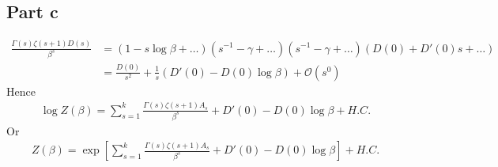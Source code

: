 \documentclass[a4paper,12pt]{article}
\begin{document}
\subsection*{Part c}
\begin{equation}
	\begin{aligned}
		\frac{\Gamma(s)\zeta(s+1)D(s)}{\beta^{s}}&=(1-s\log \beta+\dots)(s^{-1}-\gamma+\dots)(s^{-1}-\gamma+\dots)(D(0)+D'(0)s+\dots)
		\\&=\frac{D(0)}{s^2}+\frac{1}{s}(D'(0)-D(0)\log \beta)+\mathcal{O}(s^{0})
	\end{aligned}
\end{equation}
Hence
\begin{equation}
\begin{aligned}
\log Z(\beta)=\sum_{s=1}^{k}\frac{\Gamma(s)\zeta(s+1)A_s}{\beta^{s}}+	D'(0)-D(0)\log \beta+H.C.
\end{aligned}
\end{equation}
Or
\begin{equation}
	\begin{aligned}
 Z(\beta)=\exp[\sum_{s=1}^{k}\frac{\Gamma(s)\zeta(s+1)A_s}{\beta^{s}}+	D'(0)-D(0)\log \beta]+H.C.
	\end{aligned}
\end{equation}
\end{document}
